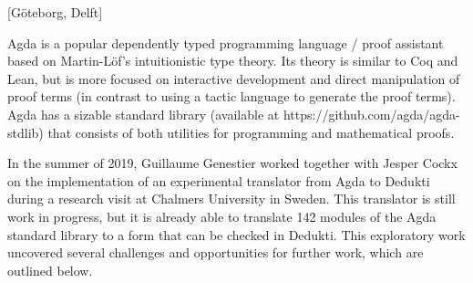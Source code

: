[G\"oteborg, Delft]

Agda is a popular dependently typed programming language / proof
assistant based on Martin-L\"of’s intuitionistic type theory. Its theory
is similar to Coq and Lean, but is more focused on interactive
development and direct manipulation of proof terms (in contrast to
using a tactic language to generate the proof terms). Agda has a
sizable standard library (available at
https://github.com/agda/agda-stdlib) that consists of both utilities
for programming and mathematical proofs.


In the summer of 2019, Guillaume Genestier worked together with Jesper
Cockx on the implementation of an experimental translator from Agda to
Dedukti during a research visit at Chalmers University in Sweden. This
translator is still work in progress, but it is already able to
translate 142 modules of the Agda standard library to a form that can
be checked in Dedukti. This exploratory work uncovered several
challenges and opportunities for further work, which are outlined
below.

